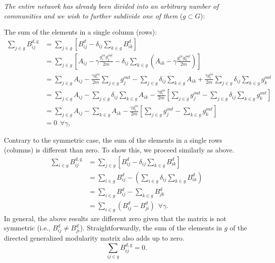 \documentclass[pdflatex,sn-mathphys-num]{sn-jnl}%
\begin{document}
\textit{The entire network has already been divided into an arbitrary number of communities and we wish to further subdivide one of them} ($g \subset G$):

The sum of the elements in a single column (rows):
\begin{equation}\label{eq_B:gen_dir_cols_g}
    \begin{split}
    \sum_{j \in g} B^{d,\text{g}}_{ij} & = \sum_{j \in g} \left[ B^{d}_{ij} - \delta_{ij}\sum_{k \in g} B^{d}_{ik} \right ] \\
    & = \sum_{j \in g} \left[ A_{ij} - \gamma \frac{g^{in}_i g^{out}_j}{2m} - \delta_{ij}\sum_{k \in g} \left( A_{ik} - \gamma \frac{g^{in}_i g^{out}_k}{2m}\right) \right ] \\
    & = \sum_{j \in g} A_{ij} - \frac{\gamma g^{in}_i}{2m} \sum_{j \in g}g^{out}_j - \sum_{j \in g} \delta_{ij}\sum_{k \in g} A_{ik} + \frac{\gamma g^{in}_i}{2m}\sum_{j \in g} \delta_{ij} \sum_{k \in g} g^{out}_k \\
    &= \sum_{j \in g} A_{ij} - \sum_{j \in g} \delta_{ij}\sum_{k \in g} A_{ik} - \frac{\gamma g^{in}_i}{2m} \left[ \sum_{j \in g}g^{out}_j - \sum_{j \in g} \delta_{ij} \sum_{k \in g} g^{out}_k \right] \\
    &= \sum_{j \in g} A_{ij} - \sum_{k \in g} A_{ik} - \frac{\gamma g^{in}_i}{2m} \left[ \sum_{j \in g}g^{out}_j - \sum_{k \in g} g^{out}_k \right] \\
    & = 0 \ \ \forall \gamma,
    \end{split}
\end{equation}

Contrary to the symmetric case, the sum of the elements in a single rows (columns) is different than zero. To show this, we proceed similarly as above.
\begin{equation}\label{eq_B:gen_dir_rows_g}
    \begin{split}
    \sum_{i \in g} B^{d,\text{g}}_{ij} & = \sum_{j \in g} \left[ B^{d}_{ij} - \delta_{ij}\sum_{k \in g} B^{d}_{ik} \right ] \\
    & = \sum_{i \in g} B^{d}_{ij} - \left( \sum_{i \in g} \delta_{ij}\sum_{k \in g} B^{d}_{ik} \right ) \\
    & = \sum_{i \in g} B^{d}_{ij} - \sum_{k \in g} B^{d}_{jk}\\
    & = \sum_{i \in g} \left ( B^{d}_{ij} - B^{d}_{ji} \right ) \ \ \forall \gamma.
    \end{split}
\end{equation} In general, the above results are different zero given that the matrix is not symmetric (i.e., $B^{d}_{ij} \neq B^{d}_{ji}$). Straightforwardly, the sum of the elements in $g$ of the directed generalized modularity matrix also adds up to zero.
\begin{equation} \label{eq_B:gen_dir_elements_g}
    \sum_{ij \in g}B^{d,\text{g}}_{ij}=0.
\end{equation}
\end{document}
